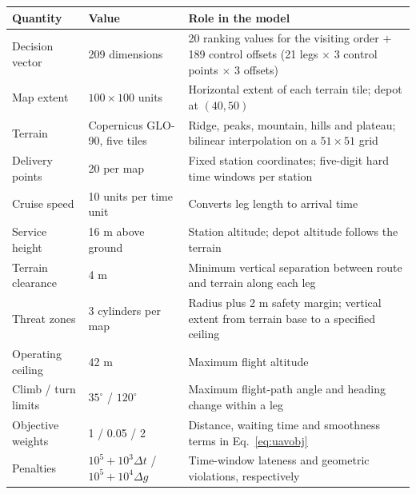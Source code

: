 \begin{tabular}{p{4.4cm}p{3.6cm}p{7.0cm}}
\toprule
Quantity & Value & Role in the model \\
\midrule
Decision vector & 209 dimensions & 20 ranking values for the visiting order $+$ 189 control offsets (21 legs $\times$ 3 control points $\times$ 3 offsets) \\
Map extent & $100\times100$ units & Horizontal extent of each terrain tile; depot at $(40,50)$ \\
Terrain & Copernicus GLO-90, five tiles & Ridge, peaks, mountain, hills and plateau; bilinear interpolation on a $51\times51$ grid \\
Delivery points & 20 per map & Fixed station coordinates; five-digit hard time windows per station \\
Cruise speed & 10 units per time unit & Converts leg length to arrival time \\
Service height & 16 m above ground & Station altitude; depot altitude follows the terrain \\
Terrain clearance & 4 m & Minimum vertical separation between route and terrain along each leg \\
Threat zones & 3 cylinders per map & Radius plus 2 m safety margin; vertical extent from terrain base to a specified ceiling \\
Operating ceiling & 42 m & Maximum flight altitude \\
Climb / turn limits & $35^\circ$ / $120^\circ$ & Maximum flight-path angle and heading change within a leg \\
Objective weights & 1 / 0.05 / 2 & Distance, waiting time and smoothness terms in Eq.~\eqref{eq:uavobj} \\
Penalties & $10^5+10^3\Delta t$ / $10^5+10^4\Delta g$ & Time-window lateness and geometric violations, respectively \\
\bottomrule
\end{tabular}
